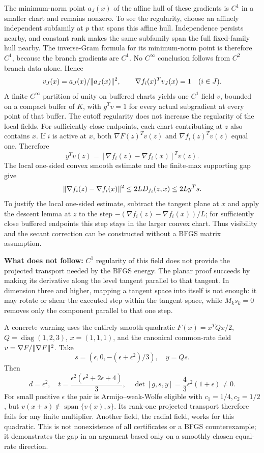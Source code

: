 The minimum-norm point $a_J(x)$ of the affine hull of these gradients is $C^1$ in a smaller chart and remains nonzero. To see the regularity, choose an affinely independent subfamily at $p$ that spans this affine hull. Independence persists nearby, and constant rank makes the same subfamily span the full fixed-family hull nearby. The inverse-Gram formula for its minimum-norm point is therefore $C^1$, because the branch gradients are $C^1$. No $C^\infty$ conclusion follows from $C^2$ branch data alone. Hence
\[
 v_J(x)=a_J(x)/\lVert a_J(x)\rVert^2,
 \qquad \nabla f_i(x)^Tv_J(x)=1\quad(i\in J).
\]
A finite $C^\infty$ partition of unity on buffered charts yields one $C^1$ field $v$, bounded on a compact buffer of $K$, with $g^Tv=1$ for every actual subgradient at every point of that buffer. The cutoff regularity does not increase the regularity of the local fields. For sufficiently close endpoints, each chart contributing at $z$ also contains $x$. If $i$ is active at $x$, both $\nabla F(z)^Tv(z)$ and $\nabla f_i(z)^Tv(z)$ equal one. Therefore
\[
 y^Tv(z)=[\nabla f_i(z)-\nabla f_i(x)]^Tv(z).
\]
The local one-sided convex smooth estimate and the finite-max supporting gap give
\[
 \lVert \nabla f_i(z)-\nabla f_i(x)\rVert^2
 \le2L D_{f_i}(z,x)\le2L y^Ts.
\]
To justify the local one-sided estimate, subtract the tangent plane at $x$ and apply the descent lemma at $z$ to the step $-(\nabla f_i(z)-\nabla f_i(x))/L$; for sufficiently close buffered endpoints this step stays in the larger convex chart. Thus visibility and the secant correction can be constructed without a BFGS matrix assumption.

\textbf{What does not follow:} $C^1$ regularity of this field does not provide the projected transport needed by the BFGS energy. The planar proof succeeds by making its derivative along the level tangent parallel to that tangent. In dimension three and higher, mapping a tangent space into itself is not enough: it may rotate or shear the executed step within the tangent space, while $M_ks_k=0$ removes only the component parallel to that one step.

A concrete warning uses the entirely smooth quadratic $F(x)=x^TQx/2$, $Q=\operatorname{diag}(1,2,3)$, $x=(1,1,1)$, and the canonical common-rate field $v=\nabla F/\lVert \nabla F\rVert^2$. Take
\[
 s=(\epsilon,0,-(\epsilon+\epsilon^2)/3),\quad y=Qs.
\]
Then
\[
 d=\epsilon^2,\quad t=\frac{\epsilon^2(\epsilon^2+2\epsilon+4)}3,\quad
 \det[g,s,y]=\frac43\epsilon^2(1+\epsilon)\ne0.
\]
For small positive $\epsilon$ the pair is Armijo--weak-Wolfe eligible with $c_1=1/4,c_2=1/2$, but $v(x+s)\notin\operatorname{span}\{v(x),s\}$. Its rank-one projected transport therefore fails for any finite multiplier. Another field, the radial field, works for this quadratic. This is not nonexistence of all certificates or a BFGS counterexample; it demonstrates the gap in an argument based only on a smoothly chosen equal-rate direction.


